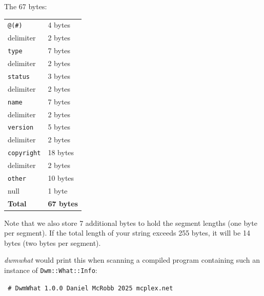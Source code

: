 The 67 bytes: \hfill
\begin{tabular}{ll}
  \texttt{@(\#)}      &  4 bytes \\
  delimiter           &  2 bytes \\
  \texttt{type}       &  7 bytes \\
  delimiter           &  2 bytes \\
  \texttt{status}     &  3 bytes \\
  delimiter           &  2 bytes \\
  \texttt{name}       &  7 bytes \\
  delimiter           &  2 bytes \\
  \texttt{version}    &  5 bytes \\
  delimiter           &  2 bytes \\
  \texttt{copyright}  & 18 bytes \\
  delimiter           &  2 bytes \\
  \texttt{other}      & 10 bytes \\
  null                &  1 byte \\ \hline
  \textbf{Total}      & \textbf{67 bytes}
\end{tabular}

Note that we also store 7 additional bytes to hold the segment lengths (one byte
per segment).  If the total length of your string exceeds 255 bytes, it will be
14 bytes (two bytes per segment).

{\em dwmwhat} would print this when scanning a compiled program
containing such an instance of \texttt{Dwm::What::Info}:

\texttt{
\#  DwmWhat 1.0.0 Daniel McRobb 2025 mcplex.net
}
